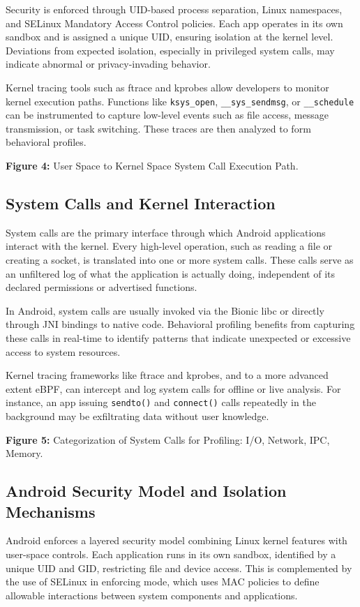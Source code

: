 \documentclass[a4paper,12pt]{report}
\begin{document}
Security is enforced through UID-based process separation, Linux namespaces, and SELinux Mandatory Access Control policies. Each app operates in its own sandbox and is assigned a unique UID, ensuring isolation at the kernel level. Deviations from expected isolation, especially in privileged system calls, may indicate abnormal or privacy-invading behavior.

Kernel tracing tools such as ftrace and kprobes allow developers to monitor kernel execution paths. Functions like \texttt{ksys\_open}, \texttt{\_\_sys\_sendmsg}, or \texttt{\_\_schedule} can be instrumented to capture low-level events such as file access, message transmission, or task switching. These traces are then analyzed to form behavioral profiles.

\textbf{Figure 4:} User Space to Kernel Space System Call Execution Path.

\subsection{System Calls and Kernel Interaction}
System calls are the primary interface through which Android applications interact with the kernel. Every high-level operation, such as reading a file or creating a socket, is translated into one or more system calls. These calls serve as an unfiltered log of what the application is actually doing, independent of its declared permissions or advertised functions.

In Android, system calls are usually invoked via the Bionic libc or directly through JNI bindings to native code. Behavioral profiling benefits from capturing these calls in real-time to identify patterns that indicate unexpected or excessive access to system resources.

Kernel tracing frameworks like ftrace and kprobes, and to a more advanced extent eBPF, can intercept and log system calls for offline or live analysis. For instance, an app issuing \texttt{sendto()} and \texttt{connect()} calls repeatedly in the background may be exfiltrating data without user knowledge.

\textbf{Figure 5:} Categorization of System Calls for Profiling: I/O, Network, IPC, Memory.

\subsection{ Android Security Model and Isolation Mechanisms}
Android enforces a layered security model combining Linux kernel features with user-space controls. Each application runs in its own sandbox, identified by a unique UID and GID, restricting file and device access. This is complemented by the use of SELinux in enforcing mode, which uses MAC policies to define allowable interactions between system components and applications.
\end{document}
